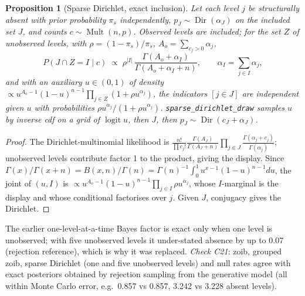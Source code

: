 \documentclass[11pt,a4paper]{article}
\newtheorem{proposition}{Proposition}
\theoremstyle{definition}
\theoremstyle{remark}
\newcommand{\Dir}{\operatorname{Dir}}
\newcommand{\Mult}{\operatorname{Mult}}
\begin{document}
\begin{proposition}[Sparse Dirichlet, exact inclusion]\label{prop:sparsedir}
Let each level $j$ be structurally absent with prior probability $\pi_s$ independently, $p_J\sim\Dir(\alpha_J)$ on the included set $J$, and counts $c\sim\Mult(n,p)$. Observed levels are included; for the set $Z$ of unobserved levels, with $\rho=(1-\pi_s)/\pi_s$, $A_o=\sum_{c_j>0}\alpha_j$,
\[
P(J\cap Z=I\mid c)\;\propto\;\rho^{|I|}\,\frac{\Gamma(A_o+\alpha_I)}{\Gamma(A_o+\alpha_I+n)},\qquad \alpha_I=\textstyle\sum_{j\in I}\alpha_j,
\]
and with an auxiliary $u\in(0,1)$ of density $\propto u^{A_o-1}(1-u)^{n-1}\prod_{j\in Z}(1+\rho u^{\alpha_j})$, the indicators $[j\in J]$ are independent given $u$ with probabilities $\rho u^{\alpha_j}/(1+\rho u^{\alpha_j})$. \texttt{sparse\_dirichlet\_draw} samples $u$ by inverse cdf on a grid of $\operatorname{logit}u$, then $J$, then $p_J\sim\Dir(c_J+\alpha_J)$.
\end{proposition}
\begin{proof}
The Dirichlet-multinomial likelihood is $\frac{n!}{\prod c_j!}\frac{\Gamma(A_J)}{\Gamma(A_J+n)}\prod_{j\in J}\frac{\Gamma(\alpha_j+c_j)}{\Gamma(\alpha_j)}$; unobserved levels contribute factor 1 to the product, giving the display. Since $\Gamma(x)/\Gamma(x+n)=B(x,n)/\Gamma(n)=\Gamma(n)^{-1}\int_0^1u^{x-1}(1-u)^{n-1}du$, the joint of $(u,I)$ is $\propto u^{A_o-1}(1-u)^{n-1}\prod_{j\in I}\rho u^{\alpha_j}$, whose $I$-marginal is the display and whose conditional factorises over $j$. Given $J$, conjugacy gives the Dirichlet.
\end{proof}
\noindent The earlier one-level-at-a-time Bayes factor is exact only when one level is unobserved; with five unobserved levels it under-stated absence by up to 0.07 (rejection reference), which is why it was replaced. \emph{Check C21}: zoib, grouped zoib, sparse Dirichlet (one and five unobserved levels) and null rates agree with exact posteriors obtained by rejection sampling from the generative model (all within Monte Carlo error, e.g.\ 0.857 vs 0.857, 3.242 vs 3.228 absent levels).
\end{document}

